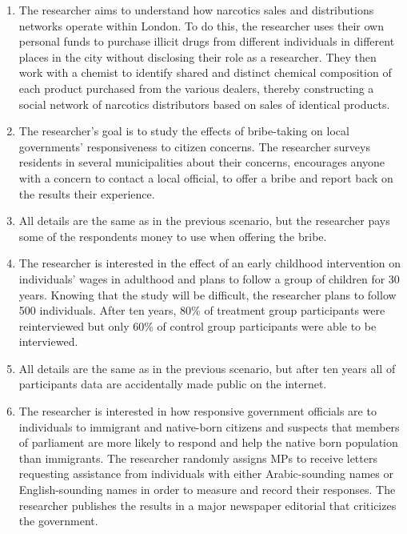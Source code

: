 \documentclass[12pt,a4]{article}
\begin{document}
\begin{enumerate}
\item The researcher aims to understand how narcotics sales and distributions networks operate within London. To do this, the researcher uses their own personal funds to purchase illicit drugs from different individuals in different places in the city without disclosing their role as a researcher. They then work with a chemist to identify shared and distinct chemical composition of each product purchased from the various dealers, thereby constructing a social network of narcotics distributors based on sales of identical products. %

\item The researcher's goal is to study the effects of bribe-taking on local governments' responsiveness to citizen concerns. The researcher surveys residents in several municipalities about their concerns, encourages anyone with a concern to contact a local official, to offer a bribe and report back on the results their experience.

\item All details are the same as in the previous scenario, but the researcher pays some of the respondents money to use when offering the bribe.

\item The researcher is interested in the effect of an early childhood intervention on individuals' wages in adulthood and plans to follow a group of children for 30 years. Knowing that the study will be difficult, the researcher plans to follow 500 individuals. After ten years, 80\% of treatment group participants were reinterviewed but only 60\% of control group participants were able to be interviewed. %

\item All details are the same as in the previous scenario, but after ten years all of participants data are accidentally made public on the internet.

\item The researcher is interested in how responsive government officials are to individuals to immigrant and native-born citizens and suspects that members of parliament are more likely to respond and help the native born population than immigrants. The researcher randomly assigns MPs to receive letters requesting assistance from individuals with either Arabic-sounding names or English-sounding names in order to measure and record their responses. The researcher publishes the results in a major newspaper editorial that criticizes the government. %


\end{enumerate}
\end{document}
